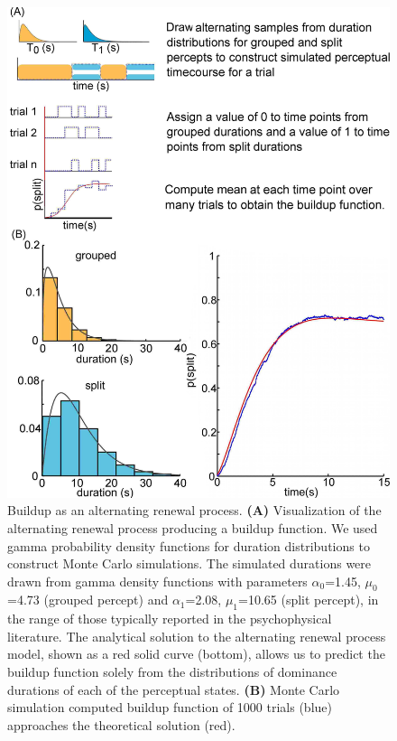 \begin{figure}
	\centering
	\includegraphics[scale=1.4]{ch2Figs/2-percepts_distributions_buf_mcconv.jpg}
	\caption{Buildup as an alternating renewal process. \textbf{(A)} Visualization of the alternating renewal process producing a buildup function. We used gamma probability density functions for duration distributions to construct Monte Carlo simulations. The simulated durations were drawn from gamma density functions with parameters $\alpha_0$=1.45, $\mu_0$=4.73 (grouped percept) and $\alpha_1$=2.08, $\mu_1$=10.65 (split percept), in the range of those typically reported in the psychophysical literature. The analytical solution to the alternating renewal process model, shown as a red solid curve (bottom), allows us to predict the buildup function solely from the distributions of dominance durations of each of the perceptual states. \textbf{(B)} Monte Carlo simulation computed buildup function of 1000 trials (blue) approaches the theoretical solution (red).}
	\label{fig:mcconv}
\end{figure}

